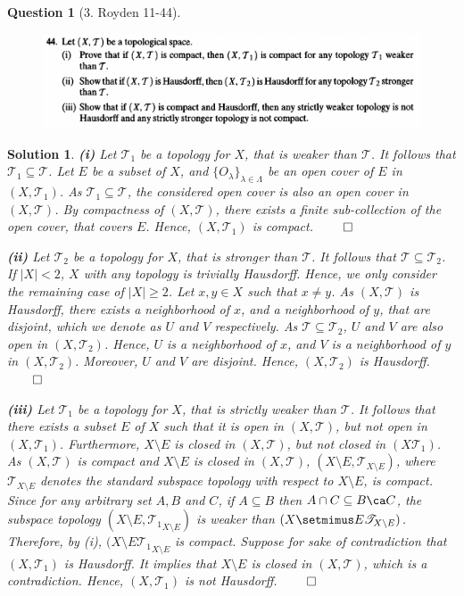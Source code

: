 \documentclass{article} %
\theoremstyle{quest}
\newtheorem*{question}{Question}
\newtheorem*{solution}{Solution}
\begin{document}
\begin{question}[3. Royden 11-44]
\hfill
\begin{figure}[h!]
  \centering
    \includegraphics[width=1\textwidth]{11-44}
\end{figure}
\end{question}
\begin{solution} 
\textbf{(i)} 
Let $\mathscr{T}_1$ be a topology for $X$, that is weaker than $\mathscr{T}$.
It follows that $\mathscr{T}_1 \subseteq \mathscr{T}$. Let $E$ be
a subset of $X$, and $\{O_\lambda \}_{\lambda \in \Lambda}$ be 
an open cover of $E$ in $(X,\mathscr{T}_1)$. 
As $\mathscr{T}_1 \subseteq \mathscr{T}$, 
the considered open cover is also an open cover in $(X,\mathscr{T})$. 
By compactness of $(X,\mathscr{T})$, 
there exists a finite sub-collection of the open cover, that covers $E$.
Hence, $(X,\mathscr{T}_1)$ is compact. \hfill $\qed$ 

\smallskip

\textbf{(ii)}
Let $\mathscr{T}_2$ be a topology for $X$, that is stronger than 
$\mathscr{T}$. It follows that $\mathscr{T} \subseteq \mathscr{T}_2$. 
If $|X| < 2$, $X$ with any topology is trivially Hausdorff. Hence,
we only consider the remaining case of $|X| \geq 2$. 
Let $x,y \in X$ such that $x \neq y$. As $(X,\mathscr{T})$ is Hausdorff,
there exists a neighborhood of $x$, and a neighborhood of $y$, that are
disjoint, which we denote as $U$ and $V$ respectively. As 
$\mathscr{T} \subseteq \mathscr{T}_2$, $U$ and $V$ are also open in 
$(X,\mathscr{T}_2)$. Hence, $U$ is a neighborhood of $x$, and $V$
is a neighborhood of $y$ in $(X,\mathscr{T}_2)$. Moreover, $U$ and $V$ are
disjoint. Hence, $(X,\mathscr{T}_2)$ is Hausdorff. \hfill $\qed$
 
\smallskip

\textbf{(iii)} 
Let $\mathscr{T}_1$
be a topology for $X$, that is strictly weaker than $\mathscr{T}$. It follows
that there exists a subset $E$ of $X$ such that it is open in 
$(X,\mathscr{T})$, but not open in $(X,\mathscr{T}_1)$. Furthermore, 
$X \setminus E$ is closed in $(X,\mathscr{T})$, but not closed in
$(X\mathscr{T}_1)$. As $(X,\mathscr{T})$ is compact and $X \setminus E$
is closed in $(X,\mathscr{T})$, $(X\setminus E, \mathscr{T}_{X\setminus E})$,
where $\mathscr{T}_{X\setminus E}$ denotes the standard subspace topology 
with respect to $X \setminus E$, is compact. Since for any arbitrary set
$A,B$ and $C$, if $A \subseteq B$ then $A \cap C \subseteq B \ca C$,
the subspace topology $(X\setminus E, \mathscr{T_1}_{X \setminus E})$ 
is weaker than $(X\setmimus E \mathscr{T}_{X \setminus E})$. Therefore,
by (i), $(X \setminus E \mathscr{T_1}_{X \setminus E}$ is compact. 
Suppose for sake of contradiction that $(X,\mathscr{T}_1)$
is Hausdorff. It implies that $X \setminus E$ is closed in
$(X,\mathscr{T})$, which is a contradiction. Hence, $(X,\mathscr{T}_1)$
is not Hausdorff. \hfill $\qed$


\end{solution}
\end{document}
